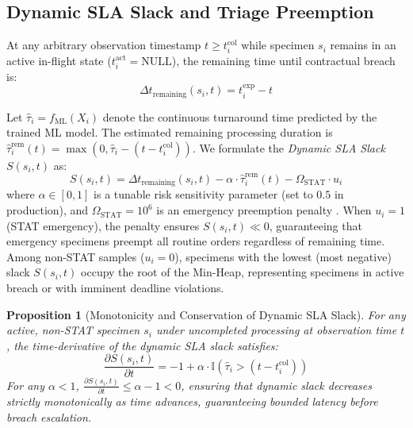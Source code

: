 \documentclass[conference]{IEEEtran}
\newtheorem{proposition}{Proposition}
\begin{document}
\subsection{Dynamic SLA Slack and Triage Preemption}
At any arbitrary observation timestamp $t \ge t_i^{\text{col}}$ while specimen $s_i$ remains in an active in-flight state ($t_i^{\text{act}} = \text{NULL}$), the remaining time until contractual breach is:
\begin{equation}
\Delta t_{\text{remaining}}(s_i, t) = t_i^{\text{exp}} - t
\end{equation}

Let $\hat{\tau}_i = f_{\text{ML}}(X_i)$ denote the continuous turnaround time predicted by the trained ML model. The estimated remaining processing duration is $\hat{\tau}_i^{\text{rem}}(t) = \max\left(0, \hat{\tau}_i - (t - t_i^{\text{col}})\right)$. We formulate the \textit{Dynamic SLA Slack} $S(s_i, t)$ as:
\begin{equation}
S(s_i, t) = \Delta t_{\text{remaining}}(s_i, t) - \alpha \cdot \hat{\tau}_i^{\text{rem}}(t) - \Omega_{\text{STAT}} \cdot u_i
\label{eq:sla_slack}
\end{equation}
where $\alpha \in [0, 1]$ is a tunable risk sensitivity parameter (set to $0.5$ in production), and $\Omega_{\text{STAT}} = 10^6$ is an emergency preemption penalty \cite{baker1984sequencing}. When $u_i = 1$ (STAT emergency), the penalty ensures $S(s_i, t) \ll 0$, guaranteeing that emergency specimens preempt all routine orders regardless of remaining time. Among non-STAT samples ($u_i = 0$), specimens with the lowest (most negative) slack $S(s_i, t)$ occupy the root of the Min-Heap, representing specimens in active breach or with imminent deadline violations.

\begin{proposition}[Monotonicity and Conservation of Dynamic SLA Slack]
For any active, non-STAT specimen $s_i$ under uncompleted processing at observation time $t$, the time-derivative of the dynamic SLA slack satisfies:
\begin{equation}
\frac{\partial S(s_i, t)}{\partial t} = -1 + \alpha \cdot \mathbb{I}\left( \hat{\tau}_i > (t - t_i^{\text{col}}) \right)
\end{equation}
For any $\alpha < 1$, $\frac{\partial S(s_i, t)}{\partial t} \le \alpha - 1 < 0$, ensuring that dynamic slack decreases strictly monotonically as time advances, guaranteeing bounded latency before breach escalation.
\end{proposition}
\end{document}
